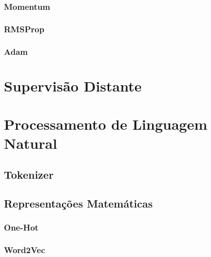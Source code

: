 \subsubsection{Momentum}

\subsubsection{RMSProp}

\subsubsection{Adam}

\section{Supervisão Distante}

\section{Processamento de Linguagem Natural}

\subsection{Tokenizer}

\subsection{Representações Matemáticas}

\subsubsection{One-Hot}

\subsubsection{Word2Vec}

